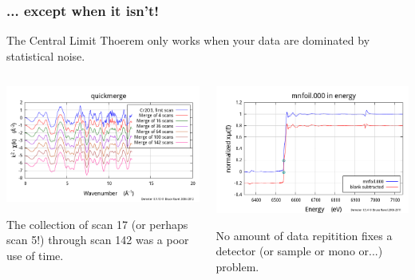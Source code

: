\documentclass[10pt, xcolor=x11names, compress]{beamer}
\begin{document}
\begin{frame}
  \frametitle{... except when it isn't!}
  \begin{alertblock}{}
    The Central Limit Thoerem only works when your data are dominated
    by statistical noise.
  \end{alertblock}

  \begin{columns}[T]
    \begin{column}{0.5\linewidth}
      \includegraphics[width=\linewidth]{images/cr2o3.png}

      \bigskip

      The collection of scan 17 (or perhaps scan 5!) through scan 142
      was a poor use of time.
    \end{column}
    \begin{column}{0.5\linewidth}
      \includegraphics[width=\linewidth]{images/mnxmu.png}  

      \bigskip
    
      No amount of data repitition fixes a detector (or sample
      or mono or...) problem.
    \end{column}
  \end{columns}
\end{frame}
\end{document}
